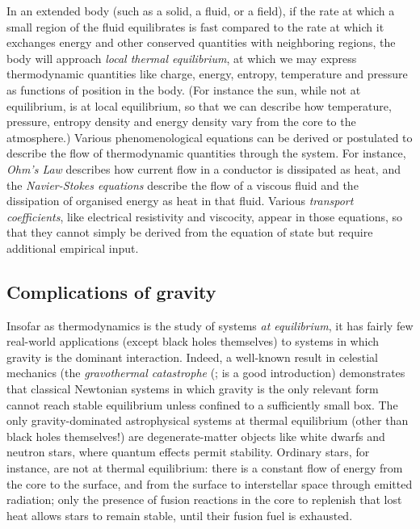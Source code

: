 \documentclass[12pt]{article}
\begin{document}
In an extended body (such as a solid, a fluid, or a field), if the rate at which a small region of the fluid equilibrates is fast compared to the rate at which it exchanges energy and other conserved quantities with neighboring regions, the body will approach \emph{local thermal equilibrium}, at which we may express thermodynamic quantities like charge, energy, entropy, temperature and pressure as functions of position in the body. (For instance the sun, while not at equilibrium, is at local equilibrium, so that we can describe how temperature, pressure, entropy density and energy density vary from the core to the atmosphere.) Various phenomenological equations can be derived or postulated to describe the flow of thermodynamic quantities through the system. For instance, \emph{Ohm's Law} describes how current flow in a conductor is dissipated as heat, and the \emph{Navier-Stokes equations} describe the flow of a viscous fluid and the dissipation of organised energy as heat in that fluid. Various \emph{transport coefficients}, like electrical resistivity and viscocity, appear in those equations, so that they cannot simply be derived from the equation of state but require additional empirical input.



\subsection{Complications of gravity}\label{td-gravity}

Insofar as thermodynamics is the study of systems \emph{at equilibrium}, it has fairly few real-world applications (except black holes themselves) to systems in which gravity is the dominant interaction. Indeed, a well-known result in celestial mechanics (the \emph{gravothermal catastrophe} (;  is a good introduction) demonstrates that classical Newtonian systems in which gravity is the only relevant form cannot reach stable equilibrium unless confined to a sufficiently small box. The only gravity-dominated astrophysical systems at thermal equilibrium (other than black holes themselves!) are degenerate-matter objects like white dwarfs and neutron stars, where quantum effects permit stability. Ordinary stars, for instance, are not at thermal equilibrium: there is a constant flow of energy from the core to the surface, and from the surface to interstellar space through emitted radiation; only the presence of fusion reactions in the core to replenish that lost heat allows stars to remain stable, until their fusion fuel is exhausted. 
\end{document}
